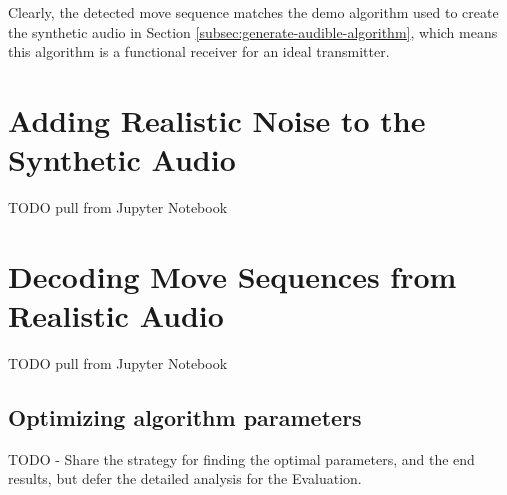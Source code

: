 Clearly, the detected move sequence matches the demo algorithm used to create the synthetic audio in Section \ref{subsec:generate-audible-algorithm}, which means this algorithm is a functional receiver for an ideal transmitter.


\section{Adding Realistic Noise to the Synthetic Audio}
\label{sec:adding-realistic-noise}

TODO pull from Jupyter Notebook


\section{Decoding Move Sequences from Realistic Audio}
\label{sec:decoding-realistic-noise}

TODO pull from Jupyter Notebook

\subsection{Optimizing algorithm parameters}
TODO - Share the strategy for finding the optimal parameters, and the end results, but defer the detailed analysis for the Evaluation.
